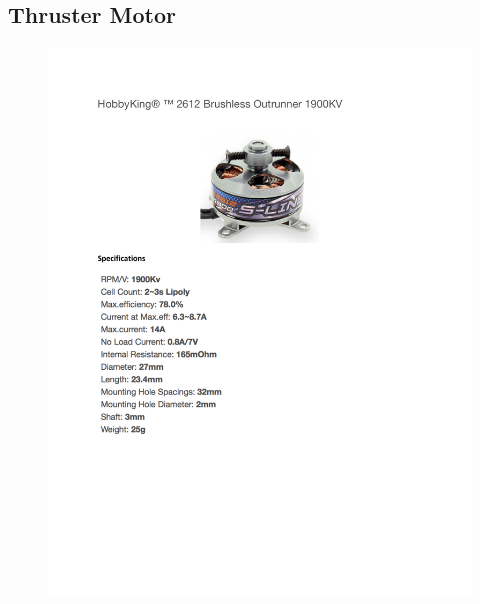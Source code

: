 \documentclass[../main.tex]{subfiles}
\begin{document}
\subsection{Thruster Motor \cite{ThrusterMotor}} \label{thrusterMotor}
\begin{figure}[H]
	\centering
	\includegraphics[width=\textwidth]{img/specs/motor_thruster.pdf}
\end{figure}

\end{document}
